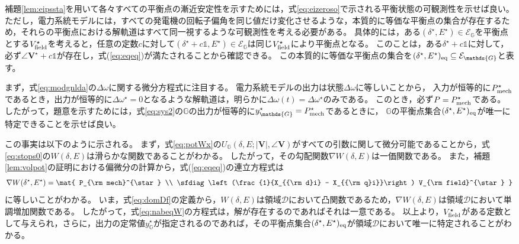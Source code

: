 \documentclass[tombow,dvipdfmx]{corona-a5-1.1}
\begin{document}
\begin{証明}
補題\ref{lem:eipssta}を用いて各々すべての平衡点の漸近安定性を示すためには，式\ref{eq:eizeroso}で示される平衡状態の可観測性を示せば良い。
ただし，電力系統モデルには，すべての発電機の回転子偏角を同じ値だけ変化させるような，本質的に等価な平衡点の集合が存在するため，それらの平衡点における解軌道はすべて同一視するような可観測性を考える必要がある。
具体的には，ある$(\delta^{\star},E^{\star}) \in \mathcal{E}_{\mathds{G}}$を平衡点とする$V_{\rm field}^{\star}$を考えると，任意の定数$c$に対して$(\delta^{\star}+c \mathds{1},E^{\star}) \in \mathcal{E}_{\mathds{G}}$は同じ$V_{\rm field}^{\star}$により平衡点となる。
このことは，ある$\delta^{\star}+c \mathds{1}$に対して，必ず$\angle \bm{V}^{\star}+c \mathds{1}$が存在し，式(\ref{eq:eqeq})が満たされることから確認できる。
この本質的に等価な平衡点の集合を$(\delta^{\star} ,E^{\star})_{\rm eq} \subseteq \mathcal{E}_{\mathds{G}}$と表す。

まず，式\ref{eq:modgnlda}の$\Delta \omega$に関する微分方程式に注目する。
電力系統モデルの出力は状態$\Delta \omega$に等しいことから，
入力が恒等的に$P_{\rm mech}^{\star}$であるとき，出力が恒等的に$\Delta \omega^{\star}=0$となるような解軌道は，明らかに$\Delta \omega(t) = \Delta \omega^{\star}$のみである。
このとき，必ず$P = P_{\rm mech}^{\star}$である。
したがって，題意を示すためには，式\ref{eq:sys2}の$\mathds{G}$の出力が恒等的に$y_{\mathds{G}}^{\star} = P_{\rm mech}^{\star}$であるときに，
$\mathds{G}$の平衡点集合$(\delta^{\star} ,E^{\star})_{\rm eq}$が唯一に特定できることを示せば良い。

この事実は以下のように示される。
まず，式\ref{eq:potWx}の$U_{\mathds{G}}(\delta, E; |\bm{V}|, \angle \bm{V})$がすべての引数に関して微分可能であることから，式\ref{eq:stops0}の$W(\delta,E)$は滑らかな関数であることがわかる。
したがって，その勾配関数$\nabla W(\delta,E)$は一価関数である。
また，補題\ref{lem:volpot}の証明における偏微分の計算から，式(\ref{eq:eqeq})の連立方程式は
\begin{align}\label{eq:nabeqW}
\nabla W(\delta^{\star},E^{\star})
=
\mat{
P_{\rm mech}^{\star} \\
\sfdiag\left(\frac{1}{X_{{\rm d}i} - X_{{\rm q}i}}\right) V_{\rm field}^{\star}
}
\end{align}
に等しいことがわかる。
いま，式\ref{eq:domDf}の定義から，$W(\delta,E)$は領域$\mathcal{D}$において凸関数であるため，$\nabla W(\delta,E)$は領域$\mathcal{D}$において単調増加関数である\cite{rockafellar1970convex,boyd2004convex}。
したがって，式\ref{eq:nabeqW}の方程式は，解が存在するのであればそれは一意である。
以上より，$V_{\rm field}^{\star}$がある定数として与えられ，さらに，出力の定常値$y_{\mathds{G}}^{\star}$が指定されるのであれば，その平衡点集合$(\delta^{\star} ,E^{\star})_{\rm eq}$が領域$\mathcal{D}$において唯一に特定されることがわかる。


\end{証明}
\end{document}
